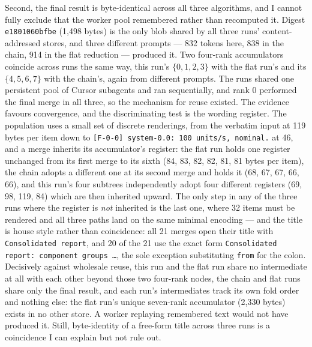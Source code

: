 \documentclass[11pt]{article}
\begin{document}
Second, the final result is byte-identical across all three algorithms, and I cannot
fully exclude that the worker pool remembered rather than recomputed it. Digest
\texttt{e1801060bfbe} (1{,}498 bytes) is the only blob shared by all three runs'
content-addressed stores, and three different prompts --- 832 tokens here, 838 in the
chain, 914 in the flat reduction --- produced it. Two four-rank accumulators coincide
across runs the same way, this run's $\{0,1,2,3\}$ with the flat run's and its
$\{4,5,6,7\}$ with the chain's, again from different prompts. The runs shared one
persistent pool of Cursor subagents and ran sequentially, and rank 0 performed the final
merge in all three, so the mechanism for reuse existed. The evidence favours
convergence, and the discriminating test is the wording register. The population uses a
small set of discrete renderings, from the verbatim input at 119 bytes per item down to
\texttt{[F-0-0] system-0.0: 100 units/s, nominal.} at 46, and a merge inherits its
accumulator's register: the flat run holds one register unchanged from its first merge
to its sixth (84, 83, 82, 82, 81, 81 bytes per item), the chain adopts a different one
at its second merge and holds it (68, 67, 67, 66, 66), and this run's four subtrees
independently adopt four different registers (69, 98, 119, 84) which are then inherited
upward. The only step in any of the three runs where the register is \emph{not}
inherited is the last one, where 32 items must be rendered and all three paths land on
the same minimal encoding --- and the title is house style rather than coincidence: all
21 merges open their title with \texttt{Consolidated report}, and 20 of the 21 use the
exact form \texttt{Consolidated report: component groups \dots}, the sole exception
substituting \texttt{from} for the colon. Decisively against wholesale reuse, this
run and the flat run share no intermediate at all with each other beyond those two
four-rank nodes, the chain and flat runs share only the final result, and each run's
intermediates track its own fold order and nothing else: the flat run's unique
seven-rank accumulator (2{,}330 bytes) exists in no other store. A worker replaying
remembered text would not have produced it. Still, byte-identity of a free-form title
across three runs is a coincidence I can explain but not rule out.
\end{document}
